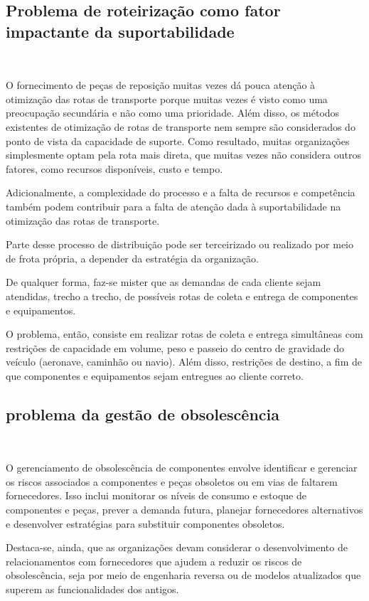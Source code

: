 \documentclass{amsart}
\begin{document}
\subsection{Problema de roteirização como fator impactante da suportabilidade}\

O fornecimento de peças de reposição muitas vezes dá pouca atenção à otimização das rotas de transporte porque muitas vezes é visto como uma preocupação secundária e não como uma prioridade.
Além disso, os métodos existentes de otimização de rotas de transporte nem sempre são considerados do ponto de vista da capacidade de suporte. Como resultado, muitas organizações simplesmente optam pela rota mais direta, que muitas vezes não considera outros fatores, como recursos disponíveis, custo e tempo.

Adicionalmente, a complexidade do processo e a falta de recursos e competência também podem contribuir para a falta de atenção dada à suportabilidade na otimização das rotas de transporte.

Parte desse processo de distribuição pode ser terceirizado ou realizado por meio de frota própria, a depender da estratégia da organização.

De qualquer forma, faz-se mister que as demandas de cada cliente sejam atendidas, trecho a trecho, de possíveis rotas de coleta e entrega de componentes e equipamentos.

O problema, então, consiste em realizar rotas de coleta e entrega simultâneas com restrições de capacidade em volume,  peso e passeio do centro de gravidade do veículo (aeronave, caminhão ou navio). Além disso, restrições de destino, a fim de que componentes e equipamentos sejam entregues ao cliente correto.


\subsection{problema da gestão de obsolescência}\

O gerenciamento de obsolescência de componentes envolve identificar e gerenciar os riscos associados a componentes e peças obsoletos ou em vias de faltarem fornecedores. Isso inclui monitorar os níveis de consumo e estoque de componentes e peças, prever a demanda futura, planejar fornecedores alternativos e desenvolver estratégias para substituir componentes obsoletos.

Destaca-se, ainda, que as organizações devam considerar o desenvolvimento de relacionamentos com fornecedores que ajudem a reduzir os riscos de obsolescência, seja por meio de engenharia reversa ou de modelos atualizados que superem as funcionalidades dos antigos.
\end{document}
